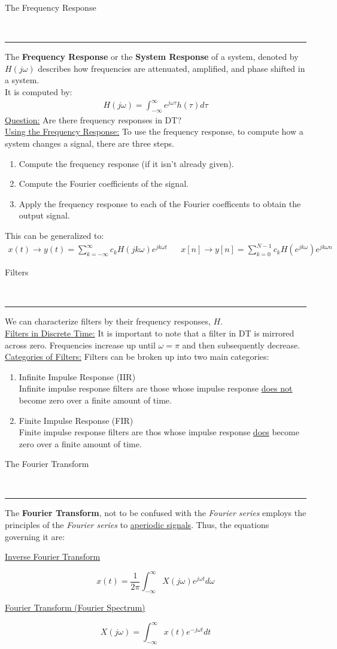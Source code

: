\documentclass{article}
\newcommand{\header}[1]{\begin{large}\noindent #1\end{large}\\\rule{\textwidth}{0.5pt}}
\newcommand{\gap}{\medskip\\}
\newcommand{\centertext}[1]{\begin{center}#1\end{center}}
\newcommand{\jomega}{j\omega}
\begin{document}
\header{The Frequency Response}

The \textbf{Frequency Response} or the \textbf{System Response} of a system, denoted
by $H(j\omega)$ describes how frequencies are attenuated, amplified, and phase shifted
in a system. 
\smallskip\\
It is computed by:
\begin{align*}
    H(j\omega) = \int_{-\infty}^\infty e^{j\omega \tau}h(\tau){d}\tau 
\end{align*}
\underline{Question:} Are there frequency responses in DT?
\gap
\underline{Using the Frequency Response:} To use the frequency response, to compute
how a system changes a signal, there are three steps.
\begin{enumerate}
    \item Compute the frequency response (if it isn't already given).
    \item Compute the Fourier coefficients of the signal.
    \item Apply the frequency response to each of the Fourier coefficents to obtain
    the output signal.
\end{enumerate}
This can be generalized to:
\begin{align*}
    x(t) \to y(t) = \sum_{k = -\infty}^\infty c_k H(jk \omega)e^{jk\omega t} &&
    x[n] \to y[n] = \sum_{k = 0}^{N - 1}c_k H(e^{jk\omega})e^{jk\omega n}
\end{align*}

\header{Filters}
We can characterize filters by their frequency responses, $H$.
\gap
\underline{Filters in Discrete Time:} It is important to note that a filter in DT
is mirrored across zero. Frequencies increase up until $\omega = \pi$ and then
subsequently decrease.
\gap
\underline{Categories of Filters:} Filters can be broken up into two main categories:
\begin{enumerate}
    \item Infinite Impulse Response (IIR)\\
    Infinite impulse response filters are those whose impulse response \underline{does not}
    become zero over a finite amount of time.
    \item Finite Impulse Response (FIR)\\
    Finite impulse response filters are thos whose impulse response \underline{does} 
    become zero over a finite amount of time.
\end{enumerate}

\pagebreak

\header{The Fourier Transform}
The \textbf{Fourier Transform}, not to be confused with the \textit{Fourier series}
employs the principles of the \textit{Fourier series} to \underline{aperiodic signals}.
Thus, the equations governing it are:

\begin{multicols}{2}
    \centertext{\underline{Inverse Fourier Transform}}
    \[
        x(t) = \frac{1}{2\pi}\int_{-\infty}^\infty X(j\omega)e^{j\omega t}{d}\omega
    \]
    \vfill\null\columnbreak
    \centertext{\underline{Fourier Transform (Fourier Spectrum)}}
    \[
        X(\jomega) = \int_{-\infty}^\infty x(t)e^{-\jomega t}{d}t  
    \]
    \vfill\null
\end{multicols}
\end{document}
